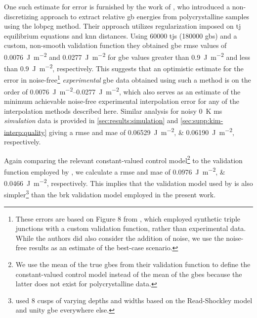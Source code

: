 \documentclass[final,twocolumn,12pt]{elsarticle}
\begin{document}
One such estimate for error is furnished by the work of \citet{shenDeterminingGrainBoundary2019}, who introduced a non-discretizing approach to extract relative \gls{gb} energies from polycrystalline samples using the \gls{lobpcg} method. Their approach utilizes regularization imposed on \gls{tj} equilibrium equations and \gls{knn} distances. Using \num{60000} \glspl{tj} (\num{180000} \glspl{gb}) and a custom, non-smooth validation function they obtained \gls{gbe} \gls{rmse} values of \SI{0.0076}{\J\per\square\meter} and \SI{0.0277}{\J\per\square\meter} for \gls{gbe} values greater than \SI{0.9}{\J\per\square\meter} and less than \SI{0.9}{\J\per\square\meter}, respectively. This suggests that an optimistic estimate for the error in noise-free\footnote{These errors are based on Figure 8 from \citet{shenDeterminingGrainBoundary2019}, which employed synthetic triple junctions with a custom validation function, rather than experimental data. While the authors did also consider the addition of noise, we use the noise-free results as an estimate of the best-case scenario.} \emph{experimental} \gls{gbe} data obtained using such a method is on the order of \SIrange{0.0076}{0.0277}{\J\per\square\meter}, which also serves as an estimate of the minimum achievable noise-free experimental interpolation error for any of the interpolation methods described here. Similar analysis for noisy \SI{0}{\kelvin} \gls{ms} \emph{simulation} data is provided in \cref{sec:results:simulation} and \cref{sec:supp:kim-interp:quality} giving a \gls{rmse} and \gls{mae} of \SIlist{0.06529;0.06190}{\joule\per\square\meter}, respectively.

Again comparing the relevant constant-valued control model\footnote{We use the mean of the true \glspl{gbe} from their validation function to define the constant-valued control model instead of the mean of the \inpt{} \glspl{gbe} because the latter does not exist for polycrystalline data.} to the validation function employed by \citet{shenDeterminingGrainBoundary2019}, we calculate a \gls{rmse} and \gls{mae} of \SIlist{0.0976;0.0466}{\joule\per\square\meter}, respectively. This implies that the validation model used by \citet{shenDeterminingGrainBoundary2019} is also simpler\footnote{\citet{shenDeterminingGrainBoundary2019} used 8 cusps of varying depths and widths based on the Read-Shockley model and unity \gls{gbe} everywhere else.} than the \gls{brk} validation model employed in the present work.
\end{document}

